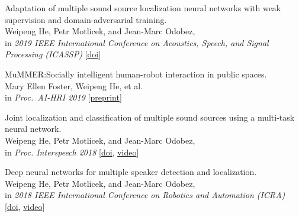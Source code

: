 \documentclass[a4paper,9pt]{extarticle} %
\begin{document}
\begin{enumerate}[label={[\arabic*]}]

  \item Adaptation of multiple sound source localization neural networks with weak supervision and domain-adversarial training. \\
        Weipeng He, Petr Motlicek, and Jean-Marc Odobez, \\
        in \textit{2019 IEEE International Conference on Acoustics, Speech, and Signal Processing (ICASSP)}
        [\href{https://doi.org/10.1109/ICASSP.2019.8682655}{doi}]

  \item MuMMER:\@ Socially intelligent human-robot interaction in public spaces. \\
        Mary Ellen Foster, Weipeng He, et al. \\
        in \textit{Proc.\ AI-HRI 2019}
        [\href{https://arxiv.org/abs/1909.06749}{preprint}]

  \item Joint localization and classification of multiple sound sources using a multi-task neural network. \\
        Weipeng He, Petr Motlicek, and Jean-Marc Odobez, \\
        in \textit{Proc. Interspeech 2018}
        [\href{http://doi.org/10.21437/Interspeech.2018-1269}{doi}, \href{https://www.youtube.com/watch?v=O7bQvg03RTc}{video}]

  \item Deep neural networks for multiple speaker detection and localization. \\
        Weipeng He, Petr Motlicek, and Jean-Marc Odobez, \\
        in \textit{2018 IEEE International Conference on Robotics and Automation (ICRA)}
        [\href{http://doi.org/10.1109/ICRA.2018.8461267}{doi}, \href{https://www.youtube.com/watch?v=_4EwuVlE_pU}{video}]



\end{enumerate}
\end{document}
